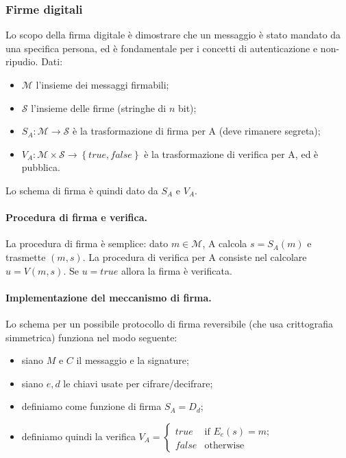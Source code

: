 \documentclass[a4paper, 11pt, twoside]{article}
\begin{document}
	\subsubsection{Firme digitali}
	Lo scopo della firma digitale è dimostrare che un messaggio è stato mandato da una specifica persona, ed è fondamentale per i concetti di autenticazione e non-ripudio. Dati: \begin{itemize}
		\item $\mathcal{M}$ l'insieme dei messaggi firmabili;
		\item $\mathcal{S}$ l'insieme delle firme (stringhe di $n$ bit);
		\item $S_A:\mathcal{M} \to \mathcal{S}$ è la trasformazione di firma per A (deve rimanere segreta);
		\item $V_A:\mathcal{M} \times \mathcal{S} \to \left\{true, false \right\}$ è la trasformazione di verifica per A, ed è pubblica.
	\end{itemize}

	Lo schema di firma è quindi dato da $S_A$ e $V_A$.
	\paragraph{Procedura di firma e verifica.} La procedura di firma è semplice: dato $m \in \mathcal{M}$, A calcola $s=S_A(m)$ e trasmette $(m,s)$. La procedura di verifica per A consiste nel calcolare $u=V(m,s)$. Se $u=true$ allora la firma è verificata.
	
	\paragraph{Implementazione del meccanismo di firma.}
	Lo schema per un possibile protocollo di firma reversibile (che usa crittografia simmetrica) funziona nel modo seguente: \begin{itemize}
		\item siano $M$ e $C$ il messaggio e la signature;
		\item siano $e,d$ le chiavi usate per cifrare/decifrare;
		\item definiamo come funzione di firma $S_A = D_d$;
		\item definiamo quindi la verifica $V_A = \begin{cases}
			true &\text{if } E_e(s) = m; \\
			false &\text{otherwise}
		\end{cases}$
	\end{itemize}
\end{document}
